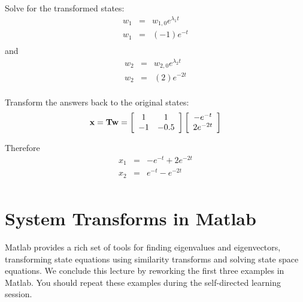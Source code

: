 

Solve for the transformed states:
\begin{eqnarray*}
	w_1 & = & w_{1,0}e^{\lambda_1t} \\
	w_1 & = & (-1)e^{-t} \\
\end{eqnarray*}
and
\begin{eqnarray*}
	w_2 & = & w_{2,0}e^{\lambda_2t} \\
	w_2 & = & (2)e^{-2t} \\
\end{eqnarray*}

Transform the answers back to the original states:
\[
{\bf{x}} = {\bf{Tw}} = \left[ {\begin{array}{*{20}c}
   1 & 1  \\
   { - 1} & { - 0.5}  \\
\end{array}} \right]\left[ {\begin{array}{*{20}c}
   { - e^{ - t} }  \\
   {2e^{ - 2t} }  \\
\end{array}} \right]
\]

Therefore
\begin{eqnarray*}
	x_1 & = & -e^{-t} + 2e^{-2t} \\
	x_2 & = & e^{-t}-e^{-2t} \\
\end{eqnarray*}
 
\section*{System Transforms in Matlab}

Matlab provides a rich set of tools for finding eigenvalues and eigenvectors, transforming state equations using similarity transforms and solving state space equations. We conclude this lecture by reworking the first three examples in Matlab. You should repeat these examples during the self-directed learning session.

